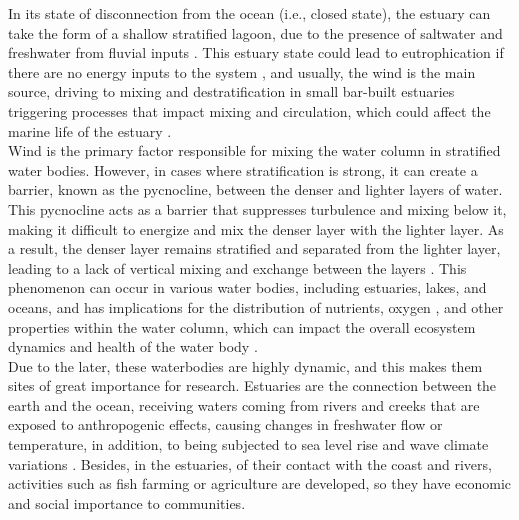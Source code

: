 \documentclass[tesis.tex]{subfiles}
\begin{document}
In its state of disconnection from the ocean (i.e., closed state), the estuary can take the form of a shallow stratified lagoon, due to the presence of saltwater and freshwater from fluvial inputs \citep{Behrens2016}. This estuary state could lead to eutrophication if there are no energy inputs to the system \citep{nunes2014responses}, and usually, the wind is the main source, driving to mixing and destratification in small bar-built estuaries \citep{Gale2006} triggering processes that impact mixing and circulation, which could affect the marine life of the estuary \citep{marti2008relating}. \\

Wind is the primary factor responsible for mixing the water column in stratified water bodies. However, in cases where stratification is strong, it can create a barrier, known as the pycnocline, between the denser and lighter layers of water. This pycnocline acts as a barrier that suppresses turbulence and mixing below it, making it difficult to energize and mix the denser layer with the lighter layer. As a result, the denser layer remains stratified and separated from the lighter layer, leading to a lack of vertical mixing and exchange between the layers \citep{Cousins2010}. This phenomenon can occur in various water bodies, including estuaries, lakes, and oceans, and has implications for the distribution of nutrients, oxygen \citep{Kelly2018}, and other properties within the water column, which can impact the overall ecosystem dynamics and health of the water body \citep{marti2008relating}.\\  

Due to the later, these waterbodies are highly dynamic, and this makes them sites of great importance for research. Estuaries are the connection between the earth and the ocean, receiving waters coming from rivers and creeks that are exposed to anthropogenic effects, causing changes in freshwater flow or temperature, in addition, to being subjected to sea level rise and wave climate variations \citep{grez2020evidence, holt2010potential, thorne2021wetlands}. Besides, in the estuaries, of their contact with the coast and rivers, activities such as fish farming or agriculture are developed, so they have economic and social importance to communities. \\
\end{document}
